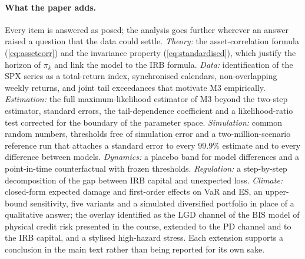 \paragraph{What the paper adds.}
Every item is answered as posed; the analysis goes further wherever an answer raised a question that the data could settle. \emph{Theory:} the asset-correlation formula (\ref{eq:assetcorr}) and the invariance property (\ref{eq:standardised}), which justify the horizon of $\pi_k$ and link the model to the IRB formula. \emph{Data:} identification of the SPX series as a total-return index, synchronised calendars, non-overlapping weekly returns, and joint tail exceedances that motivate M3 empirically. \emph{Estimation:} the full maximum-likelihood estimator of M3 beyond the two-step estimator, standard errors, the tail-dependence coefficient and a likelihood-ratio test corrected for the boundary of the parameter space. \emph{Simulation:} common random numbers, thresholds free of simulation error and a two-million-scenario reference run that attaches a standard error to every $99.9\%$ estimate and to every difference between models. \emph{Dynamics:} a placebo band for model differences and a point-in-time counterfactual with frozen thresholds. \emph{Regulation:} a step-by-step decomposition of the gap between IRB capital and unexpected loss. \emph{Climate:} closed-form expected damage and first-order effects on VaR and ES, an upper-bound sensitivity, five variants and a simulated diversified portfolio in place of a qualitative answer; the overlay identified as the LGD channel of the BIS model of physical credit risk presented in the course, extended to the PD channel and to the IRB capital, and a stylised high-hazard stress. Each extension supports a conclusion in the main text rather than being reported for its own sake.
